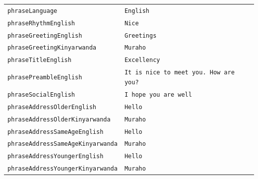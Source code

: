 \documentclass{CSSRforAfrica}
\begin{document}
\begin{table}[H]
\begin{tabular}{l l}
{\footnotesize \verb+phraseLanguage+}                                            & {\footnotesize \verb+English+} \vspace{-1.5mm}  \\
{\footnotesize \verb+phraseRhythmEnglish+}                                   & {\footnotesize \verb+Nice+}\vspace{-1.5mm} \\
{\footnotesize \verb+phraseGreetingEnglish+}                                  & {\footnotesize \verb+Greetings+}\vspace{-1.5mm} \\
{\footnotesize \verb+phraseGreetingKinyarwanda+}                         & {\footnotesize \verb+Muraho+}\vspace{-1.5mm} \\
{\footnotesize \verb+phraseTitleEnglish+}                                        & {\footnotesize \verb+Excellency+}\vspace{-1.5mm}  \\
{\footnotesize \verb+phrasePreambleEnglish+}                                 & {\footnotesize \verb+It is nice to meet you. How are you?+}\vspace{-1.5mm} \\
{\footnotesize \verb+phraseSocialEnglish+}                                       & {\footnotesize \verb+I hope you are well+}\vspace{-1.5mm} \\
{\footnotesize \verb+phraseAddressOlderEnglish+}                           & {\footnotesize \verb+Hello+ } \vspace{-1.5mm} \\
{\footnotesize \verb+phraseAddressOlderKinyarwanda+}                  & {\footnotesize \verb+Muraho+ } \vspace{-1.5mm} \\
{\footnotesize \verb+phraseAddressSameAgeEnglish+}                     & {\footnotesize \verb+Hello+} \vspace{-1.5mm}  \\
{\footnotesize \verb+phraseAddressSameAgeKinyarwanda+}            & {\footnotesize \verb+Muraho+} \vspace{-1.5mm}  \\
{\footnotesize \verb+phraseAddressYoungerEnglish+}                      & {\footnotesize \verb+Hello+} \vspace{-1.5mm} \\
{\footnotesize \verb+phraseAddressYoungerKinyarwanda+}              & {\footnotesize \verb+Muraho+} \vspace{-1.5mm} \\

\end{tabular}
\end{table}
\end{document}
